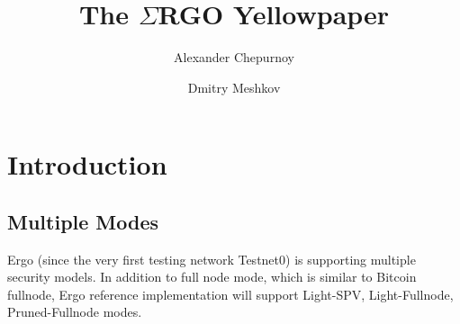 \documentclass[]{report}   %
\newcommand{\ergo}{$\Sigma$RGO}
\begin{document}
\title{The \ergo{} Yellowpaper}
\author{Alexander Chepurnoy \and Dmitry Meshkov}
\maketitle

\newpage
\tableofcontents

\section{Introduction}
\subsection{Multiple Modes}
Ergo (since the very first testing network Testnet0) is supporting multiple security models. In addition to full node mode, which is similar to Bitcoin fullnode, Ergo reference implementation will support Light-SPV, Light-Fullnode, Pruned-Fullnode modes.
\end{document}
